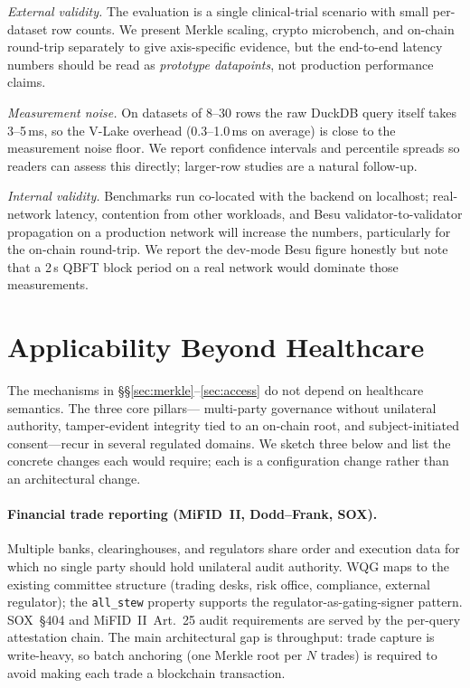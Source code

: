 \documentclass[10pt,twocolumn]{article}
\begin{document}
\emph{External validity.} The evaluation is a single clinical-trial
scenario with small per-dataset row counts. We present Merkle
scaling, crypto microbench, and on-chain round-trip separately to
give axis-specific evidence, but the end-to-end latency numbers
should be read as \emph{prototype datapoints}, not production
performance claims.

\emph{Measurement noise.} On datasets of 8--30 rows the raw DuckDB
query itself takes 3--5\,ms, so the V-Lake overhead (0.3--1.0\,ms
on average) is close to the measurement noise floor. We report
confidence intervals and percentile spreads so readers can assess
this directly; larger-row studies are a natural follow-up.

\emph{Internal validity.} Benchmarks run co-located with the
backend on localhost; real-network latency, contention from other
workloads, and Besu validator-to-validator propagation on a
production network will increase the numbers, particularly for the
on-chain round-trip. We report the dev-mode Besu figure honestly
but note that a 2\,s QBFT block period on a real network would
dominate those measurements.


\section{Applicability Beyond Healthcare}
\label{sec:applicability}

The mechanisms in \S\S\ref{sec:merkle}--\ref{sec:access} do not
depend on healthcare semantics. The three core pillars---%
multi-party governance without unilateral authority,
tamper-evident integrity tied to an on-chain root, and
subject-initiated consent---recur in several regulated domains.
We sketch three below and list the concrete changes each would
require; each is a configuration change rather than an
architectural change.

\paragraph{Financial trade reporting (MiFID~II, Dodd--Frank, SOX).}
Multiple banks, clearinghouses, and regulators share order and
execution data for which no single party should hold unilateral
audit authority. WQG maps to the existing committee structure
(trading desks, risk office, compliance, external regulator); the
\texttt{all\_stew} property supports the regulator-as-gating-signer
pattern. SOX~\S404 and MiFID~II~Art.~25 audit requirements are
served by the per-query attestation chain. The main architectural
gap is throughput: trade capture is write-heavy, so batch
anchoring (one Merkle root per $N$ trades) is required to avoid
making each trade a blockchain transaction.
\end{document}
